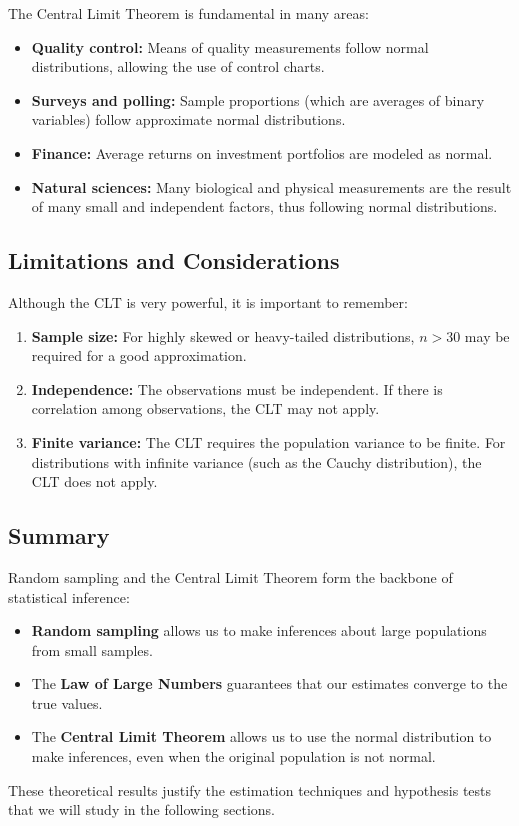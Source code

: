 The Central Limit Theorem is fundamental in many areas:

\begin{itemize}
	\item \textbf{Quality control:} Means of quality measurements follow normal distributions, allowing the use of control charts.
	
	\item \textbf{Surveys and polling:} Sample proportions (which are averages of binary variables) follow approximate normal distributions.
	
	\item \textbf{Finance:} Average returns on investment portfolios are modeled as normal.
	
	\item \textbf{Natural sciences:} Many biological and physical measurements are the result of many small and independent factors, thus following normal distributions.
\end{itemize}

\subsection{Limitations and Considerations}

Although the CLT is very powerful, it is important to remember:

\begin{enumerate}
	\item \textbf{Sample size:} For highly skewed or heavy-tailed distributions, $n > 30$ may be required for a good approximation.
	
	\item \textbf{Independence:} The observations must be independent. If there is correlation among observations, the CLT may not apply.
	
	\item \textbf{Finite variance:} The CLT requires the population variance to be finite. For distributions with infinite variance (such as the Cauchy distribution), the CLT does not apply.
\end{enumerate}

\subsection{Summary}

Random sampling and the Central Limit Theorem form the backbone of statistical inference:

\begin{itemize}
	\item \textbf{Random sampling} allows us to make inferences about large populations from small samples.
	
	\item The \textbf{Law of Large Numbers} guarantees that our estimates converge to the true values.
	
	\item The \textbf{Central Limit Theorem} allows us to use the normal distribution to make inferences, even when the original population is not normal.
\end{itemize}

These theoretical results justify the estimation techniques and hypothesis tests that we will study in the following sections.

